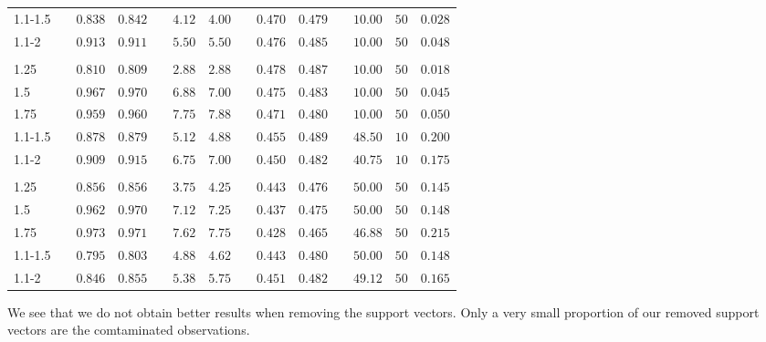 \documentclass{article}\usepackage[]{graphicx}\usepackage[]{color}
\begin{document}
\begin{table}[H]
\begin{center}
\begin{tabular}{lcrrcrrcrrcrrr}
1.1-1.5&&$0.838$&$0.842$&&$4.12$&$4.00$&&$0.470$&$0.479$&&$ 10.00$&$50$&$0.028$\tabularnewline
1.1-2&&$0.913$&$0.911$&&$5.50$&$5.50$&&$0.476$&$0.485$&&$ 10.00$&$50$&$0.048$\tabularnewline
\hline
&&&&&&&&&&&&&\tabularnewline
1.25&&$0.810$&$0.809$&&$2.88$&$2.88$&&$0.478$&$0.487$&&$ 10.00$&$50$&$0.018$\tabularnewline
1.5&&$0.967$&$0.970$&&$6.88$&$7.00$&&$0.475$&$0.483$&&$ 10.00$&$50$&$0.045$\tabularnewline
1.75&&$0.959$&$0.960$&&$7.75$&$7.88$&&$0.471$&$0.480$&&$ 10.00$&$50$&$0.050$\tabularnewline
1.1-1.5&&$0.878$&$0.879$&&$5.12$&$4.88$&&$0.455$&$0.489$&&$ 48.50$&$10$&$0.200$\tabularnewline
1.1-2&&$0.909$&$0.915$&&$6.75$&$7.00$&&$0.450$&$0.482$&&$ 40.75$&$10$&$0.175$\tabularnewline
\hline
&&&&&&&&&&&&&\tabularnewline
1.25&&$0.856$&$0.856$&&$3.75$&$4.25$&&$0.443$&$0.476$&&$ 50.00$&$50$&$0.145$\tabularnewline
1.5&&$0.962$&$0.970$&&$7.12$&$7.25$&&$0.437$&$0.475$&&$ 50.00$&$50$&$0.148$\tabularnewline
1.75&&$0.973$&$0.971$&&$7.62$&$7.75$&&$0.428$&$0.465$&&$ 46.88$&$50$&$0.215$\tabularnewline
1.1-1.5&&$0.795$&$0.803$&&$4.88$&$4.62$&&$0.443$&$0.480$&&$ 50.00$&$50$&$0.148$\tabularnewline
1.1-2&&$0.846$&$0.855$&&$5.38$&$5.75$&&$0.451$&$0.482$&&$ 49.12$&$50$&$0.165$\tabularnewline
\hline
\end{tabular}
\end{center}
\end{table}




We see that we do not obtain better results when removing the support vectors. Only a very small proportion of our removed support vectors are the comtaminated observations. 
\end{document}
